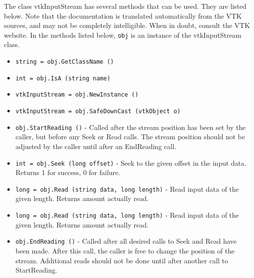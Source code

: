 The class vtkInputStream has several methods that can be used.
  They are listed below.
Note that the documentation is translated automatically from the VTK sources,
and may not be completely intelligible.  When in doubt, consult the VTK website.
In the methods listed below, \verb|obj| is an instance of the vtkInputStream class.
\begin{itemize}
\item  \verb|string = obj.GetClassName ()|

\item  \verb|int = obj.IsA (string name)|

\item  \verb|vtkInputStream = obj.NewInstance ()|

\item  \verb|vtkInputStream = obj.SafeDownCast (vtkObject o)|

\item  \verb|obj.StartReading ()| -  Called after the stream position has been set by the caller, but
 before any Seek or Read calls.  The stream position should not be
 adjusted by the caller until after an EndReading call.

\item  \verb|int = obj.Seek (long offset)| -  Seek to the given offset in the input data.  Returns 1 for
 success, 0 for failure.

\item  \verb|long = obj.Read (string data, long length)| -  Read input data of the given length.  Returns amount actually
 read.

\item  \verb|long = obj.Read (string data, long length)| -  Read input data of the given length.  Returns amount actually
 read.

\item  \verb|obj.EndReading ()| -  Called after all desired calls to Seek and Read have been made.
 After this call, the caller is free to change the position of the
 stream.  Additional reads should not be done until after another
 call to StartReading.

\end{itemize}
